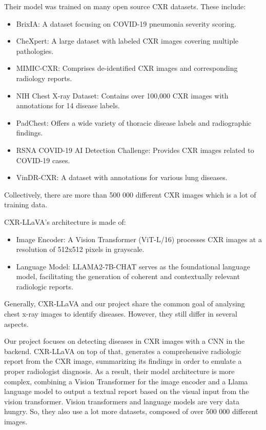 \documentclass[12pt, titlepage]{article}
\begin{document}
Their model was trained on many open source CXR datasets. These include:
\begin{itemize}
\item BrixIA: A dataset focusing on COVID-19 pneumonia severity scoring.​
\item CheXpert: A large dataset with labeled CXR images covering multiple pathologies.
\item MIMIC-CXR: Comprises de-identified CXR images and corresponding radiology reports.​
\item NIH Chest X-ray Dataset: Contains over 100,000 CXR images with annotations for 14 disease labels.
\item PadChest: Offers a wide variety of thoracic disease labels and radiographic findings.​
\item RSNA COVID-19 AI Detection Challenge: Provides CXR images related to COVID-19 cases.​
\item VinDR-CXR: A dataset with annotations for various lung diseases.
\end{itemize}

Collectively, there are more than 500 000 different CXR images which is a lot of training data.

CXR-LLaVA's architecture is made of:​
\begin{itemize}
\item Image Encoder: A Vision Transformer (ViT-L/16) processes CXR images at a resolution of 512x512 pixels in grayscale.​
\item Language Model: LLAMA2-7B-CHAT serves as the foundational language model, facilitating the generation of coherent and contextually relevant radiologic reports.
\end{itemize}

Generally, CXR-LLaVA and our project share the common goal of analysing chest x-ray images to identify diseases. However, they still differ in several aspects.

Our project focuses on detecting diseases in CXR images with a CNN in the backend. CXR-LLaVA on top of that, generates a comprehensive radiologic report from the CXR image, summarizing its findings in order to emulate a proper radiologist diagnosis. As a result, their model architecture is more complex, combining a Vision Transformer for the image encoder and a Llama language model to output a textual report based on the visual input from the vision transformer. Vision transformers and language models are very data hungry. So, they also use a lot more datasets, composed of over 500 000 different images.
\end{document}
